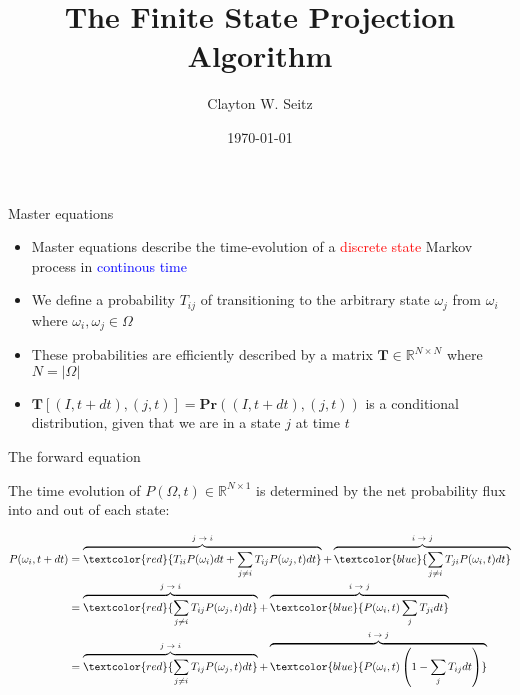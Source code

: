 \documentclass{beamer}					%
\title{The Finite State Projection Algorithm}	%
\author{Clayton W. Seitz}								%
\date{\today}									%
\begin{document}
\begin{frame}
  \titlepage
\end{frame}


\begin{frame}{Master equations}
\begin{itemize}
\item Master equations describe the time-evolution of a \textcolor{red}{discrete state} Markov process in \textcolor{blue}{continous time}\\
\vspace{0.1in}
\item We define a probability $T_{ij}$ of transitioning to the arbitrary state $\omega_{j}$ from $\omega_{i}$ where $\omega_{i},\omega_{j}\in \Omega$\\
\vspace{0.1in}
\item These probabilities are efficiently described by a matrix $\mathbf{T}\in\mathbb{R}^{N\times N}$ where $N = |\Omega|$\\
\vspace{0.1in}
\item $\mathbf{T}[(I,t+dt),(j,t)]=\mathbf{Pr}\left((I,t+dt),(j,t)\right)$ is a conditional distribution, given that we are in a state $j$ at time $t$
\end{itemize}
\end{frame}

\begin{frame}{The forward equation}

\vspace{0.2in}
The time evolution of $P(\Omega,t) \in \mathbb{R}^{N\times 1}$ is determined by the net probability flux into and out of each state:\\
\vspace{0.1in}

\begin{align*}
P(\omega_{i},t+dt) &= \overbrace{\textcolor{red}{T_{ii}P(\omega_{i})dt + \sum_{j\neq i} T_{ij}P(\omega_{j},t)dt}}^\text{$j\rightarrow i$} + \overbrace{\textcolor{blue}{\sum_{j\neq i}T_{ji}P(\omega_{i},t)dt}}^\text{$i\rightarrow j$}\\
&= \overbrace{\textcolor{red}{\sum_{j\neq i} T_{ij}P(\omega_{j},t)dt}}^\text{$j\rightarrow i$} + \overbrace{\textcolor{blue}{P(\omega_{i},t)\sum_{j}T_{ji}dt}}^\text{$i\rightarrow j$}\\
&=  \overbrace{\textcolor{red}{\sum_{j\neq i} T_{ij}P(\omega_{j},t)dt}}^\text{$j\rightarrow i$} + \overbrace{\textcolor{blue}{P(\omega_{i},t)\left(1-\sum_{j}T_{ij}dt\right)}}^\text{$i\rightarrow j$}\\
\end{align*}

\end{frame}
\end{document}
